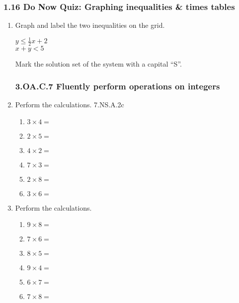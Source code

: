 \documentclass[12pt, twoside]{article}
\begin{document}
\subsubsection*{1.16 Do Now Quiz: Graphing inequalities \& times tables}
\begin{enumerate}
\item Graph and label the two inequalities on the grid. 

  \begin{multicols}{2}
    $\displaystyle y \leq \frac{1}{2}x + 2$ \\
    $x + y < 5$
  \end{multicols} \vspace{1cm}

  \begin{center}
  \end{center}

Mark the solution set of the system with a capital ``S''.

\newpage
\subsubsection*{3.OA.C.7 Fluently perform operations on integers}
\item Perform the calculations. \hfill 7.NS.A.2c
  \begin{multicols}{2}
    \begin{enumerate}[itemsep=1cm]
      \item $3 \times 4 =$
      \item $2 \times 5 =$
      \item $4 \times 2 =$
      \item $7 \times 3 =$
      \item $2 \times 8 =$
      \item $3 \times 6 =$
    \end{enumerate}
    \end{multicols} \vspace{0.25cm}

    \item Perform the calculations.
    \begin{multicols}{2}
    \begin{enumerate}[itemsep=1cm]
      \item $9 \times 8 =$
      \item $7 \times 6 =$
      \item $8 \times 5 =$
      \item $9 \times 4 =$
      \item $6 \times 7 =$
      \item $7 \times 8 =$
    \end{enumerate}
    \end{multicols} \vspace{0.25cm}


\end{enumerate}
\end{document}
